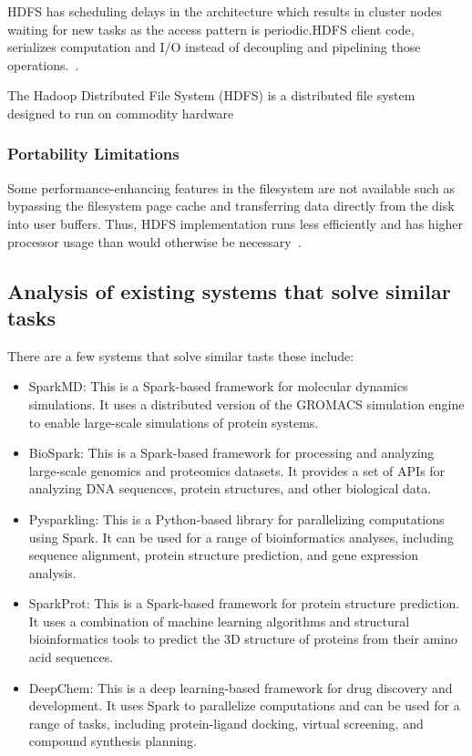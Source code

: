\documentclass[]{final_report}
\begin{document}
HDFS has scheduling delays in the architecture which results in cluster nodes waiting for new tasks as the access pattern is periodic.HDFS client code, serializes computation and I/O instead of decoupling and pipelining those operations.~\cite{shafer_hadoop_2010}.

\begin{definition}[HDFS]
    The Hadoop Distributed File System (HDFS) is a distributed file system designed to run on commodity hardware
\end{definition}

\subsubsection{Portability Limitations}
Some performance-enhancing features in the filesystem are not available such as bypassing the filesystem page cache and transferring data directly from the disk into user buffers. Thus, HDFS implementation runs less efficiently and has higher processor usage than would otherwise be necessary~\cite{shafer_hadoop_2010}.

\subsection{Analysis of existing systems that solve similar tasks}
There are a few systems that solve similar tasts these include:

\begin{itemize}
    \item SparkMD: This is a Spark-based framework for molecular dynamics simulations. It uses a distributed version of the GROMACS simulation engine to enable large-scale simulations of protein systems.
    \item BioSpark: This is a Spark-based framework for processing and analyzing large-scale genomics and proteomics datasets. It provides a set of APIs for analyzing DNA sequences, protein structures, and other biological data.
    \item Pysparkling: This is a Python-based library for parallelizing computations using Spark. It can be used for a range of bioinformatics analyses, including sequence alignment, protein structure prediction, and gene expression analysis.
    \item SparkProt: This is a Spark-based framework for protein structure prediction. It uses a combination of machine learning algorithms and structural bioinformatics tools to predict the 3D structure of proteins from their amino acid sequences.
    \item DeepChem: This is a deep learning-based framework for drug discovery and development. It uses Spark to parallelize computations and can be used for a range of tasks, including protein-ligand docking, virtual screening, and compound synthesis planning.
\end{itemize}
\end{document}
